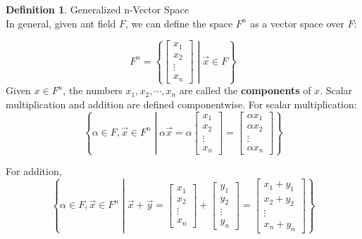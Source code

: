 \documentclass{book}
\theoremstyle{definition}
\newtheorem{definition}{Definition}[section]
\theoremstyle{remark}
\begin{document}
\begin{definition}
Generalized n-Vector Space \\

    In general, given ant field $F$, we can define the space $F^n$ as a vector space over $F$:
    
        \begin{equation*}
            F^n = \left \{ \begin{bmatrix} x_1 \\ x_2 \\ \vdots \\ x_n \end{bmatrix} \middle | \vec{x} \in F \right \}
        \end{equation*}
    Given $x \in F^n$, the numbers $x_1, x_2, \cdots, x_n$ are called the \textbf{components} of $x$. Scalar multiplication and addition are defined componentwise. 
    For scalar multiplication: 
        \begin{equation*}
            \left \{ \alpha \in F, \vec{x} \in F^n \middle | \alpha \vec{x} = \alpha \begin{bmatrix} x_1 \\ x_2 \\ \vdots \\ x_n \end{bmatrix} = \begin{bmatrix} \alpha x_1 \\ \alpha x_2 \\ \vdots \\ \alpha x_n \end{bmatrix}  \right \}
        \end{equation*}
    
    For addition, 
        \begin{equation*}
            \left \{ \alpha \in F, \vec{x} \in F^n \middle | \vec{x} + \vec{y} = \begin{bmatrix} x_1 \\ x_2 \\ \vdots \\ x_n \end{bmatrix} + \begin{bmatrix} y_1 \\ y_2 \\ \vdots \\ y_n \end{bmatrix} = \begin{bmatrix} x_1 + y_1 \\ x_2 + y_2 \\ \vdots \\ x_n + y_n \end{bmatrix} \right \}
        \end{equation*}
    

\end{definition}
\end{document}
